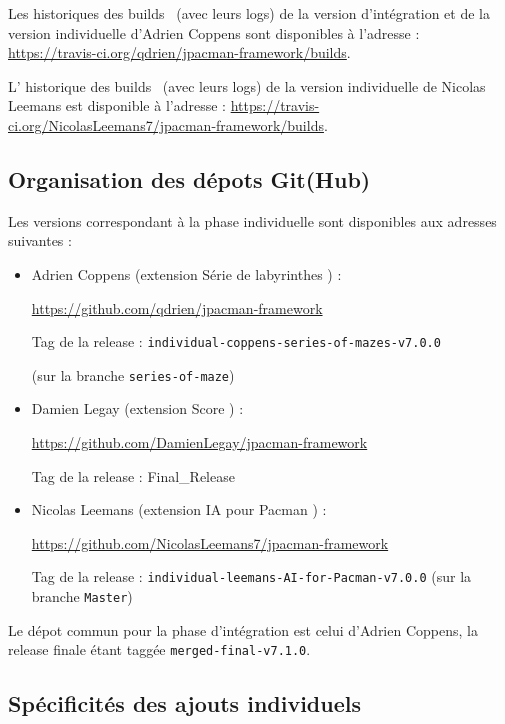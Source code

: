 \documentclass[12pt, openany]{report}
\begin{document}
Les historiques des \og builds \fg \, (avec leurs logs) de la version d'intégration et de la version individuelle d'Adrien Coppens sont disponibles à l'adresse : \url{https://travis-ci.org/qdrien/jpacman-framework/builds}.

L' historique des \og builds \fg \, (avec leurs logs) de la version individuelle de Nicolas Leemans est disponible à l'adresse : \url{https://travis-ci.org/NicolasLeemans7/jpacman-framework/builds}.

\subsection{Organisation des dépots Git(Hub)}
Les versions correspondant à la phase individuelle sont disponibles aux adresses suivantes :
\begin{itemize}
	\item Adrien Coppens (extension \og Série de labyrinthes \fg ) : 
	
	\url{https://github.com/qdrien/jpacman-framework}
	
	Tag de la release : \nolinkurl{individual-coppens-series-of-mazes-v7.0.0}
	
	(sur la branche \nolinkurl{series-of-maze})
	\item Damien Legay (extension \og Score \fg ) : 
	
	\url{https://github.com/DamienLegay/jpacman-framework}
	
	Tag de la release : \nolinkurl{}{Final\_Release}
	\item Nicolas Leemans (extension \og IA pour Pacman \fg ) : 
	
	\url{https://github.com/NicolasLeemans7/jpacman-framework}
	
	Tag de la release : \nolinkurl{individual-leemans-AI-for-Pacman-v7.0.0}
	(sur la branche \nolinkurl{Master})
\end{itemize}

Le dépot commun pour la phase d'intégration est celui d'Adrien Coppens, la release finale étant taggée \nolinkurl{merged-final-v7.1.0}.


\subsection{Spécificités des ajouts individuels}
\end{document}
